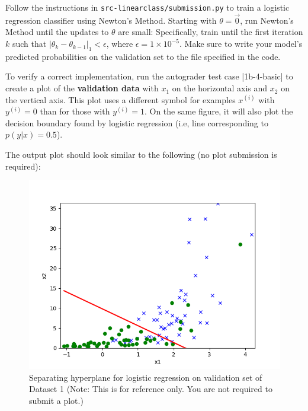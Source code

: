 \item {}
Follow the instructions in \texttt{src-linearclass/submission.py} to train a logistic regression classifier using Newton's Method. Starting with $\theta = \vec{0}$, run Newton's Method until the updates to $\theta$ are small: Specifically,  train until the first iteration $k$ such that $\vert\theta_{k} - \theta_{k-1}\vert_1 < \epsilon$, where $\epsilon = 1\times 10^{-5}$. Make sure to write your model's predicted probabilities on the validation set to the file specified in the code.

To verify a correct implementation, run the autograder test case |1b-4-basic| to create a plot of the \textbf{validation data} with $x_1$ on the horizontal axis and $x_2$ on the vertical axis. This plot uses a different symbol for examples $x^{(i)}$ with $y^{(i)} = 0$ than for those with $y^{(i)} = 1$. On the same figure, it will also plot the decision boundary found by logistic regression (i.e, line corresponding to $p(y\vert x) = 0.5$).

The output plot should look similar to the following (no plot submission is required): 

\begin{figure}[H]
	\centering
	\vspace{2mm}
	\includegraphics[width=0.65\linewidth]{01-linearclass/p01b_pred_1.png}
    \caption{Separating hyperplane for logistic regression on validation set of Dataset 1 (Note: This is for reference only.  You are not required to submit a plot.)}
\end{figure}
